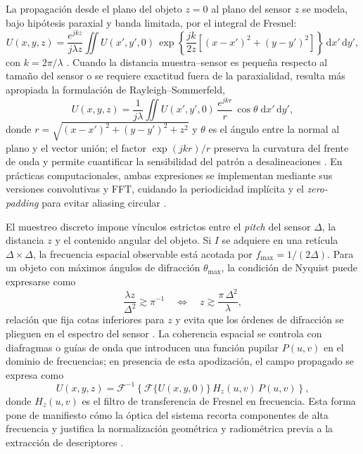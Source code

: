 La propagación desde el plano del objeto \(z=0\) al plano del sensor \(z\) se modela, bajo hipótesis paraxial y banda limitada, por el integral de Fresnel:
\begin{equation}
U(x,y,z)=\frac{e^{jkz}}{j\lambda z}\iint U(x',y',0)\,
\exp\!\left\{\frac{jk}{2z}\!\left[(x-x')^{2}+(y-y')^{2}\right]\right\}\, \mathrm{d}x'\,\mathrm{d}y',
\label{eq:fresnel}
\end{equation}
con \(k=2\pi/\lambda\) \cite{Greenbaum2014}. Cuando la distancia muestra–sensor es pequeña respecto al tamaño del sensor o se requiere exactitud fuera de la paraxialidad, resulta más apropiada la formulación de Rayleigh–Sommerfeld,
\begin{equation}
U(x,y,z)=\frac{1}{j\lambda}\iint U(x',y',0)\,
\frac{e^{jkr}}{r}\,\cos\theta\;\mathrm{d}x'\,\mathrm{d}y',
\label{eq:RS}
\end{equation}
donde \(r=\sqrt{(x-x')^{2}+(y-y')^{2}+z^{2}}\) y \(\theta\) es el ángulo entre la normal al plano y el vector unión; el factor \(\exp(jkr)/r\) preserva la curvatura del frente de onda y permite cuantificar la sensibilidad del patrón a desalineaciones \cite{Greenbaum2014}. En prácticas computacionales, ambas expresiones se implementan mediante sus versiones convolutivas y FFT, cuidando la periodicidad implícita y el \emph{zero-padding} para evitar aliasing circular \cite{Greenbaum2014,OConnor2020}.

El muestreo discreto impone vínculos estrictos entre el \emph{pitch} del sensor \(\Delta\), la distancia \(z\) y el contenido angular del objeto. Si \(I\) se adquiere en una retícula \(\Delta\times\Delta\), la frecuencia espacial observable está acotada por \(f_{\max}=1/(2\Delta)\). Para un objeto con máximos ángulos de difracción \(\theta_{\max}\), la condición de Nyquist puede expresarse como
\begin{equation}
\frac{\lambda z}{\Delta^{2}} \gtrsim \pi^{-1}\quad\Longleftrightarrow\quad
z \gtrsim \frac{\pi\,\Delta^{2}}{\lambda},
\label{eq:nyquist}
\end{equation}
relación que fija cotas inferiores para \(z\) y evita que los órdenes de difracción se plieguen en el espectro del sensor \cite{Greenbaum2014}. La coherencia espacial se controla con diafragmas o guías de onda que introducen una función pupilar \(P(u,v)\) en el dominio de frecuencias; en presencia de esta apodización, el campo propagado se expresa como
\begin{equation}
U(x,y,z)=\mathcal{F}^{-1}\!\left\{\mathcal{F}\{U(x,y,0)\}\,H_{z}(u,v)\,P(u,v)\right\},
\label{eq:angular}
\end{equation}
donde \(H_{z}(u,v)\) es el filtro de transferencia de Fresnel en frecuencia. Esta forma pone de manifiesto cómo la óptica del sistema recorta componentes de alta frecuencia y justifica la normalización geométrica y radiométrica previa a la extracción de descriptores \cite{Greenbaum2014,OConnor2020}.

